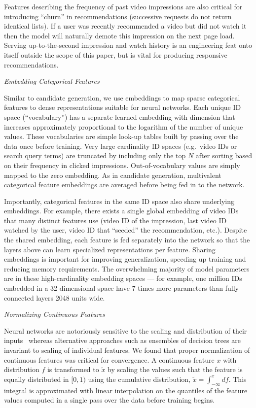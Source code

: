 Features describing the frequency of past video impressions are also
critical for introducing ``churn'' in recommendations (successive requests
do not return identical lists). If a user was recently recommended a video
but did not watch it then the model will naturally demote this impression on
the next page load. Serving up-to-the-second impression and watch history is
an engineering feat onto itself outside the scope of this paper, but is
vital for producing responsive recommendations.

\textit{Embedding Categorical Features}

Similar to candidate generation, we use embeddings to map sparse categorical
features to dense representations suitable for neural networks. Each unique
ID space (``vocabulary'') has a separate learned embedding with dimension
that increases approximately proportional to the logarithm of the number of
unique values. These vocabularies are simple look-up tables built by passing
over the data once before training. Very large cardinality ID spaces (e.g.\
video IDs or search query terms) are truncated by including only the top $N$
after sorting based on their frequency in clicked impressions.
Out-of-vocabulary values are simply mapped to the zero embedding. As in
candidate generation, multivalent categorical feature embeddings are
averaged before being fed in to the network.

Importantly, categorical features in the same ID space also share underlying
embeddings. For example, there exists a single global embedding of video IDs
that many distinct features use (video ID of the impression, last video ID
watched by the user, video ID that ``seeded'' the recommendation, etc.).
Despite the shared embedding, each feature is fed separately into the
network so that the layers above can learn specialized representations per
feature. Sharing embeddings is important for improving generalization,
speeding up training and reducing memory requirements. The overwhelming
majority of model parameters are in these high-cardinality embedding spaces
--- for example, one million IDs embedded in a 32 dimensional space have 7
times more parameters than fully connected layers 2048 units wide.

\textit{Normalizing Continuous Features}

Neural networks are notoriously sensitive to the scaling and distribution of
their inputs~\cite{ioffe2015batch} whereas alternative approaches such as
ensembles of decision trees are invariant to scaling of individual features.
We found that proper normalization of continuous features was critical for
convergence. A continuous feature $x$ with distribution $f$ is transformed
to $\tilde{x}$ by scaling the values such that the feature is equally
distributed in $[0, 1)$ using the cumulative distribution,
$\tilde{x} = \int_{-\infty}^{x} df$. This integral is approximated with
linear interpolation on the quantiles of the feature values computed in a
single pass over the data before training begins.

